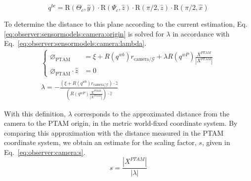         \begin{equation}
        \label{eq:observer:sensormodels:qbc}
            q^{bc} = \text{R}(\Theta_{c}, \hat{y}) \cdot \text{R}(\Psi_{c}, \hat{z}) \cdot \text{R}(\pi/2, \hat{z}) \cdot \text{R}(\pi/2, \hat{x})
        \end{equation}

        To determine the distance to this plane according to the current estimation,
        Eq. \eqref{eq:observer:sensormodels:camera:origin} is solved for $\lambda$
        in accordance with Eq.~\eqref{eq:observer:sensormodels:camera:lambda}.
        \begin{align}
            \left\lbrace
            \begin{array}{ll}
                \varnothing_{\text{PTAM}} &= \xi + R(q^{wb}) r_{\text{camera}/\mathcal{G}} + \lambda R(q^{wP}) \frac{X^{PTAM}}{|X^{PTAM}|} \\
                \varnothing_{\text{PTAM}} \cdot \hat{z} &= 0
            \end{array}\right.
            \label{eq:observer:sensormodels:camera:origin}\\
%
            \lambda = -\frac{\left(\xi + R(q^{wb}) r_{\text{camera}/\mathcal{G}} \right) \cdot \hat{z}}{\left( R(q^{wP}) \frac{X^{PTAM}}{|X^{PTAM}|} \right) \cdot \hat{z}}
            \label{eq:observer:sensormodels:camera:lambda}
        \end{align}



        With this definition, $\lambda$ corresponds to the approximated distance
        from the camera to the PTAM origin, in the metric world-fixed coordinate system.
        By comparing this approximation with the distance measured
        in the PTAM coordinate system, we obtain an estimate for the scaling factor, $s$, given
        in Eq.~\ref{eq:observer:camera:s}.
        \begin{equation}
        \label{eq:observer:camera:s}
            s = \frac{|X^{PTAM}|}{|\lambda|}
        \end{equation}


